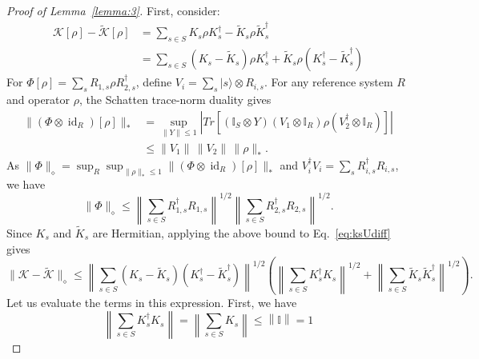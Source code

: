 \documentclass[aps,floatfix,10pt,amssymb,amsfont,amsmath,superscriptaddress,float,nofootinbib,longbibliography,nobalancelastpage,twocolumn]{revtex4-2}
\begin{document}
\begin{proof}[Proof of Lemma~\ref{lemma:3}]
First, consider:
\begin{align}
    \mathcal{K}[\rho] - \tilde{\mathcal{K}}[\rho] &= \sum_{s \in S} K_s\rho K_s^{\dagger} - \tilde K_s\rho \tilde K_s^{\dagger} \\
    &= \sum_{s \in S} (K_s-\tilde K_s)\rho K_s^{\dagger} +\tilde K_s\rho (K_s^{\dagger}- \tilde K_s^{\dagger}) \label{eq:ksUdiff}
\end{align}
For $\Phi[\rho]=\sum_sR_{1,s}\rho R_{2,s}^\dagger$, define
$V_i=\sum_s|s\rangle\otimes R_{i,s}$. For any reference system \(R\)
and operator $\rho$, the Schatten trace-norm duality gives
\begin{align}
\|(\Phi\otimes\operatorname{id}_R)[\rho]\|_*
&=\sup_{\|Y\|\leq1}
\left|Tr\!\left[
(\mathbb I_S\otimes Y)
(V_1\otimes\mathbb I_R) \rho(V_2^\dagger\otimes\mathbb I_R)
\right]\right|\\
&\leq \|V_1\|\,\|V_2\|\,\|\rho\|_*.
\end{align}
As $\|\Phi\|_{\diamond} = \sup_R\sup_{\|\rho\|_*\leq 1}\|(\Phi\otimes\operatorname{id}_R)[\rho]\|_*$ and
\(V_i^\dagger V_i=\sum_sR_{i,s}^\dagger R_{i,s}\), we have
\begin{equation}
\|\Phi\|_\diamond
\leq
\left\|\sum_{s\in S}R_{1,s}^\dagger R_{1,s}\right\|^{1/2}
\left\|\sum_{s\in S}R_{2,s}^\dagger R_{2,s}\right\|^{1/2}.
\end{equation}
Since $K_s$ and $\tilde K_s$ are Hermitian, applying the above bound to Eq.~\eqref{eq:ksUdiff}
gives
\begin{equation}
\|\mathcal{K}-\tilde{\mathcal{K}}\|_\diamond
\leq
\left\|\sum_{s\in S}(K_s - \tilde K_s)(K_s^\dagger - \tilde K_s^\dagger)\right\|^{1/2}
\left(
\left\|\sum_{s\in S}K_s^\dagger K_s\right\|^{1/2}
+
\left\|\sum_{s\in S}\tilde K_s\tilde K_s^\dagger\right\|^{1/2}
\right).
\label{eq:row-column-bound}
\end{equation}
Let us evaluate the terms in this expression. First, we have
\begin{equation}
     \left\|\sum_{s\in S} K_s^{\dagger}  K_s \right\| = \left\|\sum_{s\in S}  K_s \right\| \leq  \left\|\mathbb{I}\right\| = 1
\end{equation}


\end{proof}
\end{document}

